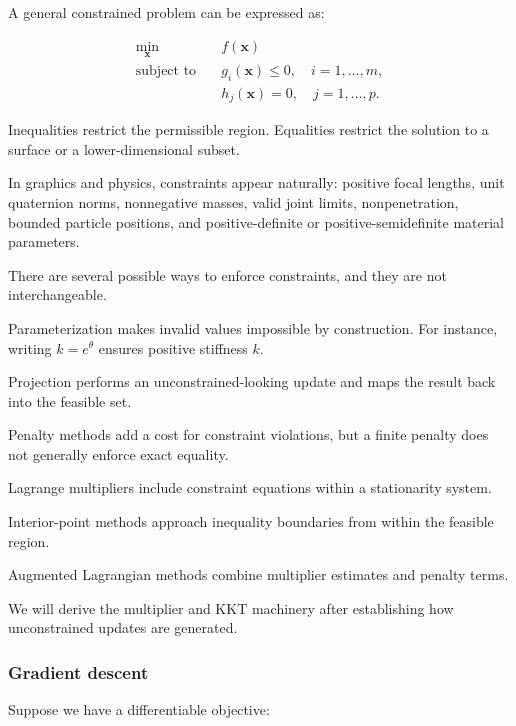 \hypertarget{02-foundations-ii-ch026-constraints-in-optimization}{}

A general constrained problem can be expressed as:

\[
\begin{aligned} \min_{\mathbf x}\quad &f(\mathbf x)\\ \text{subject to}\quad &g_i(\mathbf x)\le0,\quad i=1,\ldots,m,\\ &h_j(\mathbf x)=0,\quad j=1,\ldots,p. \end{aligned}
\]

Inequalities restrict the permissible region. Equalities restrict the solution to a surface or a lower-dimensional subset.

In graphics and physics, constraints appear naturally: positive focal lengths, unit quaternion norms, nonnegative masses, valid joint limits, nonpenetration, bounded particle positions, and positive-definite or positive-semidefinite material parameters.

There are several possible ways to enforce constraints, and they are not interchangeable.

Parameterization makes invalid values impossible by construction. For instance, writing \(k=e^\theta\) ensures positive stiffness \(k\).

Projection performs an unconstrained-looking update and maps the result back into the feasible set.

Penalty methods add a cost for constraint violations, but a finite penalty does not generally enforce exact equality.

Lagrange multipliers include constraint equations within a stationarity system.

Interior-point methods approach inequality boundaries from within the feasible region.

Augmented Lagrangian methods combine multiplier estimates and penalty terms.

We will derive the multiplier and KKT machinery after establishing how unconstrained updates are generated.

\subsubsection{Gradient descent}\label{02-foundations-ii-ch026-gradient-descent}

\hypertarget{02-foundations-ii-ch026-gradient-descent}{}

Suppose we have a differentiable objective:

